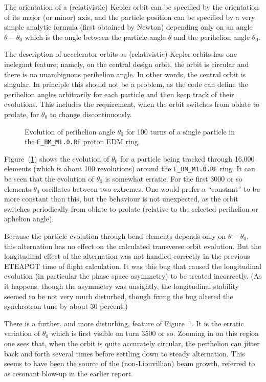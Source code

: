 \documentclass[]{article}
\begin{document}
The orientation of a (relativistic) Kepler orbit can be specified by
the orientation of its major (or minor) axis, and the particle position
can be specified by a very simple analytic formula (first obtained
by Newton) depending only on an angle $\theta-\theta_0$ which is the angle between
the particle angle $\theta$ and the perihelion angle $\theta_0$.
  
The description of accelerator orbits as (relativistic) Kepler orbits
has one inelegant feature; namely, on the central design orbit, the orbit is
circular and there is no unambiguous perihelion angle. In other words,
the central orbit is singular. In principle this
should not be a problem, as the code can define the perihelion angles
arbitrarily for each particle and then keep track of their evolutions.
This includes the requirement, when the orbit switches from oblate 
to prolate, for $\theta_0$ to change discontinuously. 

%
\begin{figure}[h]
\centering
\caption{\label{fig:theta0-evolution}Evolution of perihelion angle $\theta_0$
for 100 turns of a single particle in the {\tt E\_BM\_M1.0.RF} proton EDM ring.}
\end{figure}
%
Figure~(\ref{fig:theta0-evolution}) shows the evolution
of $\theta_0$ for a particle being tracked through 16,000 elements
(which is about 100 revolutions) around the {\tt E\_BM\_M1.0.RF} ring. 
It can be seen that the evolution of $\theta_0$ is somewhat erratic.
For the first 3000 or so elements $\theta_0$ oscillates between two
extremes. One would prefer a ``constant'' to be more constant than this,
but the behaviour is not unexpected, as the orbit switches periodically from
oblate to prolate (relative to the selected perihelion or aphelion angle).

Because the particle evolution through bend elements depends only
on $\theta-\theta_0$, this alternation has no effect on the calculated
transverse orbit evolution. But the longitudinal effect of the alternation 
was not 
handled correctly in the previous ETEAPOT time of flight calculation. 
It was this bug that caused the longitudinal evolution (in particular the
phase space asymmetry) to be treated incorrectly. (As it happens, though
the asymmetry was unsightly, the longitudinal stability seemed to be
not very much disturbed, though fixing the bug altered the synchrotron tune by
about 30 percent.)

There is a further, and more disturbing, feature of Figure~\ref{fig:theta0-evolution}.
It is the erratic variation of $\theta_0$ which is first visible on turn 
3500 or so. Zooming in on this region one sees that, when the orbit
is quite accurately circular, the perihelion can jitter back and forth
several times before settling down to steady alternation.
This seems to have been the source of the (non-Liouvillian) beam growth,
referred to as resonant blow-up in the earlier report.
\end{document}

